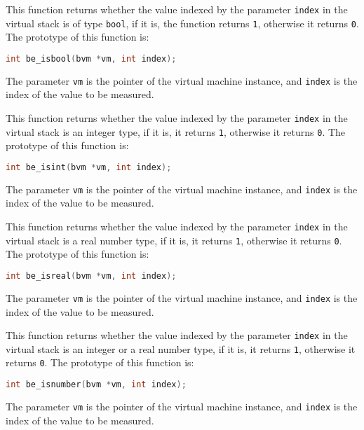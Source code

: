 
This function returns whether the value indexed by the parameter \texttt{index} in the virtual stack is of type \texttt{bool}, if it is, the function returns \texttt{1}, otherwise it returns \texttt{0}. The prototype of this function is:
\begin{lstlisting}[language=c, style=berry, numbers=none]
int be_isbool(bvm *vm, int index);
\end{lstlisting}
The parameter \texttt{vm} is the pointer of the virtual machine instance, and \texttt{index} is the index of the value to be measured.


This function returns whether the value indexed by the parameter \texttt{index} in the virtual stack is an integer type, if it is, it returns \texttt{1}, otherwise it returns \texttt{0}. The prototype of this function is:
\begin{lstlisting}[language=c, style=berry, numbers=none]
int be_isint(bvm *vm, int index);
\end{lstlisting}
The parameter \texttt{vm} is the pointer of the virtual machine instance, and \texttt{index} is the index of the value to be measured.

This function returns whether the value indexed by the parameter \texttt{index} in the virtual stack is a real number type, if it is, it returns \texttt{1}, otherwise it returns \texttt{0}. The prototype of this function is:
\begin{lstlisting}[language=c, style=berry, numbers=none]
int be_isreal(bvm *vm, int index);
\end{lstlisting}
The parameter \texttt{vm} is the pointer of the virtual machine instance, and \texttt{index} is the index of the value to be measured.


This function returns whether the value indexed by the parameter \texttt{index} in the virtual stack is an integer or a real number type, if it is, it returns \texttt{1}, otherwise it returns \texttt{0}. The prototype of this function is:
\begin{lstlisting}[language=c, style=berry, numbers=none]
int be_isnumber(bvm *vm, int index);
\end{lstlisting}
The parameter \texttt{vm} is the pointer of the virtual machine instance, and \texttt{index} is the index of the value to be measured.

